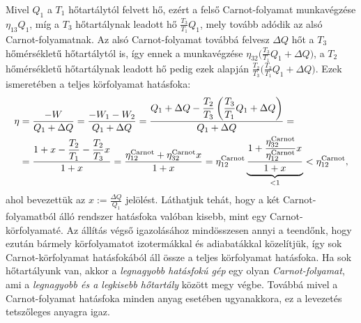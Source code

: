 Mivel $Q_1$ a $T_1$ hőtartálytól felvett hő, ezért a felső Carnot-folyamat munkavégzése $\eta_{13}Q_1$, míg a $T_3$ hőtartálynak leadott hő $\frac{T_3}{T_1}Q_1$, mely tovább adódik az alsó Carnot-folyamatnak. Az alsó Carnot-folyamat továbbá felvesz $\Delta Q$ hőt a $T_3$ hőmérsékletű hőtartálytól is, így ennek a munkavégzése $\eta_{32}\big(\frac{T_3}{T_1}Q_1+\Delta Q\big)$, a $T_2$ hőmérsékletű hőtartálynak leadott hő pedig ezek alapján $\frac{T_2}{T_3}\big(\frac{T_3}{T_1}Q_1+\Delta Q\big)$. Ezek ismeretében a teljes körfolyamat hatásfoka:
\begin{align}
\begin{split}
	\eta &= \frac{-W}{Q_1+\Delta Q} = \frac{-W_1-W_2}{Q_1+\Delta Q} = \frac{Q_1+\Delta Q-\dfrac{T_2}{T_3}\left({\dfrac{T_3}{T_1}Q_1+\Delta Q}\right)}{Q_1+\Delta Q} = \\
	&= \frac{1+x-\dfrac{T_2}{T_1}-\dfrac{T_2}{T_3}x}{1+x} = \frac{\eta_{12}^{\textnormal{Carnot}}+\eta_{32}^{\textnormal{Carnot}}x}{1+x} = \eta_{12}^{\textnormal{Carnot}}\underbrace{\frac{1+\dfrac{\eta_{32}^{\textnormal{Carnot}}}{\eta_{12}^{\textnormal{Carnot}}}x}{1+x}}_{<1}< \eta_{12}^{\textnormal{Carnot}},
\end{split}
\end{align}
ahol bevezettük az $x:=\frac{\Delta Q}{Q_1}$ jelölést. Láthatjuk tehát, hogy a két Carnot-folyamatból álló rendszer hatásfoka valóban kisebb, mint egy Carnot-körfolyamaté. Az állítás végső igazolásához mindösszesen annyi a teendőnk, hogy ezután bármely körfolyamatot izotermákkal és adiabatákkal közelítjük, így sok Carnot-körfolyamat hatásfokából áll össze a teljes körfolyamat hatásfoka. Ha sok hőtartályunk van, akkor a \emph{legnagyobb hatásfokú gép} egy olyan \emph{Carnot-folyamat}, ami a \emph{legnagyobb és a legkisebb hőtartály} között megy végbe. Továbbá mivel a Carnot-folyamat hatásfoka minden anyag esetében ugyanakkora, ez a levezetés tetszőleges anyagra igaz.

